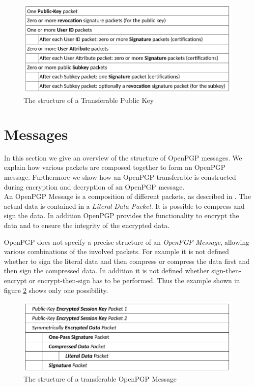 \begin{figure}[h]
	\centering
	\includegraphics[width=1\linewidth]{figures/transferable-key.png}
	\caption{The structure of a Transferable Public Key}
	\label{fig:transferable-key}
\end{figure}

\section{Messages}
\label{section:messageformat:messages}

In this section we give an overview of the structure of OpenPGP messages. We explain how various packets are composed together to form an OpenPGP message. Furthermore we show how an OpenPGP transferable is constructed during encryption and decryption of an OpenPGP message. \\

An OpenPGP Message is a composition of different packets, as described in \cite[section 11.3]{RFC4880}. The actual data is contained in a \textit{Literal Data Packet}. It is possible to compress and sign the data. In addition OpenPGP provides the functionality to encrypt the data and to ensure the integrity of the encrypted data.

OpenPGP does not specify a precise structure of an \textit{OpenPGP Message}, allowing various combinations of the involved packets. For example it is not defined whether to sign the literal data and then compress or compress the data first and then sign the compressed data. In addition it is not defined whether sign-then-encrypt or encrypt-then-sign has to be performed. Thus the example shown in figure \ref{fig:transferable-msg} shows only one possibility.

\begin{figure}[h!]
	\centering
	\includegraphics[width=1\linewidth]{figures/transferable-msg.png}
	\caption{The structure of a transferable OpenPGP Message}
	\label{fig:transferable-msg}
\end{figure}



